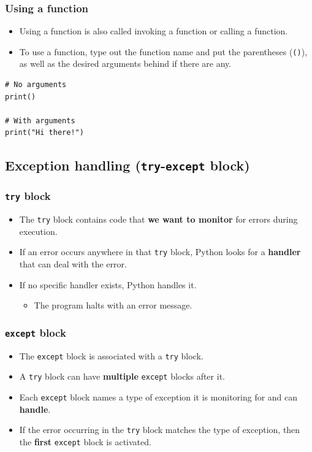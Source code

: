 \documentclass[11pt]{article}
\begin{document}
\subsubsection{Using a function}
\label{sec:orgb02d358}
\begin{itemize}
\item Using a function is also called invoking a function or calling a function.
\item To use a function, type out the function name and put the parentheses (\texttt{()}), as well as the desired arguments behind if there are any.
\end{itemize}

\begin{verbatim}
# No arguments
print()

# With arguments
print("Hi there!")
\end{verbatim}

 \newpage

\subsection{Exception handling (\texttt{try}-\texttt{except} block)}
\label{sec:org8b9bbde}

\subsubsection{\texttt{try} block}
\label{sec:org66ac8e5}
\begin{itemize}
\item The \texttt{try} block contains code that \textbf{we want to monitor} for errors during execution.
\item If an error occurs anywhere in that \texttt{try} block, Python looks for a \textbf{handler} that can deal with the error.
\item If no specific handler exists, Python handles it.
\begin{itemize}
\item The program halts with an error message.
\end{itemize}
\end{itemize}

\subsubsection{\texttt{except} block}
\label{sec:org08688c7}
\begin{itemize}
\item The \texttt{except} block is associated with a \texttt{try} block.
\item A \texttt{try} block can have \textbf{multiple} \texttt{except} blocks after it.
\item Each \texttt{except} block names a type of exception it is monitoring for and can \textbf{handle}.
\item If the error occurring in the \texttt{try} block matches the type of exception, then the \textbf{first} \texttt{except} block is activated.
\end{itemize}
\end{document}
